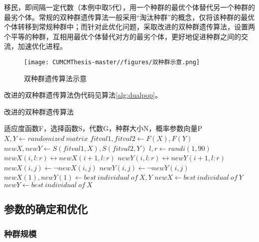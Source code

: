 \documentclass[withoutpreface,bwprint]{cumcmthesis} %
\begin{document}
移民，即间隔一定代数（本例中取5代），用一个种群的最优个体替代另一个种群的最劣个体。常规的双种群遗传算法一般采用“淘汰种群”的概念，仅将该种群的最优个体转移到常规种群中；而针对此优化问题，采取改进的双种群遗传算法，设置两个平等的种群，互相用最优个体替代对方的最劣个体，更好地促进种群之间的交流，加速优化进程。
\begin{figure}[htbp]
    \centering
    \texttt{[image: CUMCMThesis-master//figures/双种群示意.png]}
    \caption{双种群遗传算法示意}
    \label{fig:dualpopillus}
\end{figure}

改进的双种群遗传算法伪代码见算法\ref{alg:dualpop}。

\begin{algorithm}[htbp]
    \caption{改进的双种群遗传算法}
    \begin{algorithmic}[1] %
        \Require 适应度函数F，选择函数S，代数G，种群大小N，概率参数向量P
        \State $X,Y \gets randomized\ matrix$
            \State $fitval1,fitval2 \gets F(X),F(Y)$
            \State $newX,newY\gets S(fitval1,X),S(fitval2,Y)$
                    \State $l,r \gets randi(1,90)$
                    \State $newX(i,l:r) \leftrightarrow newX(i+1,l:r)$
                    \State $newY(i,l:r) \leftrightarrow newY(i+1,l:r)$
                \EndIf
            \EndFor
                    \State $newX(i,j)\gets \neg newX(i,j)$
                    \State $newY(i,j)\gets \neg newY(i,j)$
                \EndIf
            \EndFor
            \State $newX(1),newY(1)\gets best\ individual\ of\ X,Y$
                \State $newX\gets best\ individual\ of\ Y$
                \State $newY\gets best\ individual\ of\ X$
            \EndIf
        \EndFor
    \end{algorithmic}
    \label{alg:dualpop}
\end{algorithm}

\newpage

\subsection{参数的确定和优化}

\subsubsection{种群规模}
\label{sec:popsize}
\end{document}
